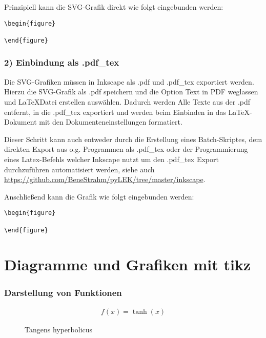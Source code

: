 Prinzipiell kann die \gls{SVG}-Grafik direkt wie folgt eingebunden werden:

\begin{Verbatim}
\begin{figure}
    
\end{figure}
\end{Verbatim}

\newpage

\subsubsection{2) Einbindung als .pdf\_tex}

Die \gls{SVG}-Grafiken müssen in Inkscape als .pdf und .pdf\_tex exportiert werden. Hierzu die \gls{SVG}-Grafik als .pdf speichern und die Option \flqq Text in PDF weglassen und \LaTeX Datei erstellen \frqq auswählen. Dadurch werden Alle Texte aus der .pdf entfernt, in die .pdf\_tex exportiert und werden beim Einbinden in das \LaTeX-Dokument mit den Dokumenteneinstellungen formatiert.

Dieser Schritt kann auch entweder durch die Erstellung eines Batch-Skriptes, dem direkten Export aus o.g. Programmen als .pdf\_tex oder der Programmierung eines Latex-Befehls welcher Inkscape nutzt um den .pdf\_tex Export durchzuführen automatisiert werden, siehe auch \url{https://github.com/BeneStrahm/pyLEK/tree/master/inkscape}.

Anschließend kann die Grafik wie folgt eingebunden werden:

\begin{Verbatim}
\begin{figure}
    
\end{figure}
\end{Verbatim}

\newpage

\section{Diagramme und Grafiken mit tikz}
\label{subsec:tikz}

\subsubsection{Darstellung von Funktionen}

\begin{figure}[htb]
\centering
\begin{align*}
f(x)=\tanh(x)
\end{align*}
\caption[Tangens hyperbolicus Aktivierungsfunktion]{Tangens hyperbolicus}
\label{fig:05_AktivTan}
\end{figure}

